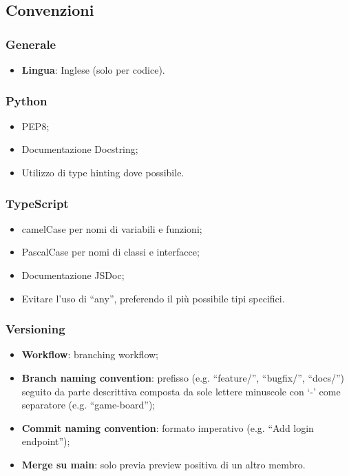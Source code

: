 \documentclass{article}
\begin{document}
\subsection{Convenzioni}
\subsubsection{Generale}
        \begin{itemize}
            \item \textbf{Lingua}: Inglese (solo per codice).
        \end{itemize}
\subsubsection{Python}
        \begin{itemize}
            \item PEP8;
            \item Documentazione Docstring;
            \item Utilizzo di type hinting dove possibile.
        \end{itemize}
\subsubsection{TypeScript}
    \begin{itemize}
        \item camelCase per nomi di variabili e funzioni;
        \item PascalCase per nomi di classi e interfacce;
        \item Documentazione JSDoc;
        \item Evitare l'uso di ``any'', preferendo il più possibile tipi specifici.
    \end{itemize}
\subsubsection{Versioning}
    \begin{itemize}
        \item \textbf{Workflow}: branching workflow;
        \item \textbf{Branch naming convention}: prefisso (e.g. ``feature/'', ``bugfix/'', ``docs/'') seguito da parte descrittiva composta da sole lettere minuscole con `-' come separatore (e.g. ``game-board'');
        \item \textbf{Commit naming convention}: formato imperativo (e.g. ``Add login endpoint'');
        \item \textbf{Merge su main}: solo previa preview positiva di un altro membro.
    \end{itemize}
\end{document}

